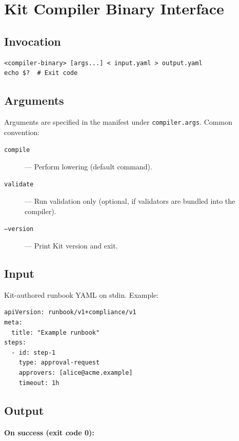 \section{Kit Compiler Binary Interface}
\label{sec:compiler-reference}

\subsection{Invocation}

\begin{verbatim}
<compiler-binary> [args...] < input.yaml > output.yaml
echo $?  # Exit code
\end{verbatim}

\subsection{Arguments}

Arguments are specified in the manifest under \texttt{compiler.args}. Common
convention:

\begin{description}
  \item[\texttt{compile}] --- Perform lowering (default command).
  \item[\texttt{validate}] --- Run validation only (optional, if validators are
    bundled into the compiler).
  \item[\texttt{--version}] --- Print Kit version and exit.
\end{description}

\subsection{Input}

Kit-authored runbook YAML on stdin. Example:

\begin{verbatim}
apiVersion: runbook/v1+compliance/v1
meta:
  title: "Example runbook"
steps:
  - id: step-1
    type: approval-request
    approvers: [alice@acme.example]
    timeout: 1h
\end{verbatim}

\subsection{Output}

\paragraph{On success (exit code 0):}

